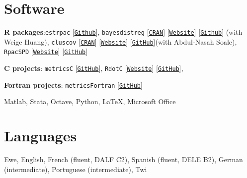 \documentclass[12pt,letterpaper]{article}
\renewenvironment{itemize}{
  \begin{list}{}{
    \setlength{\leftmargin}{1.5em}
  }
}{
  \end{list}
}
\begin{document}
\section*{Software}
\begin{itemize}
  \item \textbf{R packages}:\texttt{estrpac} [\texttt{\href{https://github.com/estsyawo/estrpac}{Github}}], \texttt{bayesdistreg} [\texttt{\href{https://CRAN.R-project.org/package=bayesdistreg}{CRAN}}] [\texttt{\href{https://estsyawo.github.io/bayesdistreg/}{Website}}] [\texttt{\href{https://github.com/estsyawo/bayesdistreg}{Github}}] (with Weige Huang), \texttt{cluscov} [\texttt{\href{https://CRAN.R-project.org/package=cluscov}{CRAN}}] [\texttt{\href{https://estsyawo.github.io/cluscov/}{Website}}] [\texttt{\href{https://github.com/estsyawo/cluscov}{GitHub}}](with Abdul-Nasah Soale), \texttt{RpacSPD} [\texttt{\href{https://estsyawo.github.io/RpacSPD/}{Website}}] [\texttt{\href{https://github.com/estsyawo/RpacSPD}{GitHub}}]

  \item \textbf{C projects}: \texttt{metricsC} [\texttt{\href{https://github.com/estsyawo/metricsC}{GitHub}}], \texttt{RdotC} [\texttt{\href{https://estsyawo.github.io/RdotC/index.html}{Website}}] [\texttt{\href{https://github.com/estsyawo/RdotC}{GitHub}}], 
  
  \item \textbf{Fortran projects}: \texttt{metricsFortran} [\texttt{\href{https://github.com/estsyawo/metricsFortran}{GitHub}}]
  \item Matlab,  Stata, Octave, Python, \LaTeX, Microsoft Office
\end{itemize}

\section*{Languages}
Ewe, English, French (fluent, DALF C2), Spanish (fluent, DELE B2), German (intermediate),  Portuguese (intermediate), Twi
\end{document}
